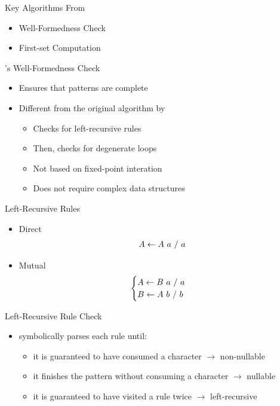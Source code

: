 \documentclass{beamer}
\begin{document}
\begin{frame}{Key Algorithms From \lpeg{}}
    \begin{itemize}
        \item Well-Formedness Check
        \item First-set Computation
    \end{itemize}
\end{frame}

\begin{frame}{\lpeg{}'s Well-Formedness Check}
    \begin{itemize}
        \item Ensures that patterns are complete
        \item Different from the original algorithm by \citeauthor{ford_parsing_2004}
        \begin{itemize}
            \item Checks for left-recursive rules
            \item Then, checks for degenerate loops
            \item Not based on fixed-point interation
            \item Does not require complex data structures
        \end{itemize}
    \end{itemize}
\end{frame}

\begin{frame}{Left-Recursive Rules}
    \begin{itemize}
        \item Direct
        \begin{align*}
            A \leftarrow A\ a\ /\ a
        \end{align*}
        \item Mutual
        \begin{align*}
            \begin{cases}
               A \leftarrow B\ a\ /\ a \\
               B \leftarrow A\ b\ /\ b
            \end{cases}
        \end{align*}
    \end{itemize}
\end{frame}

\begin{frame}{Left-Recursive Rule Check}
    \begin{itemize}
        \item \lpeg{} symbolically parses each rule until:
        \begin{itemize}
            \item it is guaranteed to have consumed a character $\to$ non-nullable
            \item it finishes the pattern without consuming a character $\to$ nullable
            \item it is guaranteed to have visited a rule twice $\to$ left-recursive
        \end{itemize}
    \end{itemize}
\end{frame}
\end{document}
